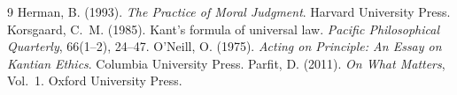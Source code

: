\documentclass{situationist-preprint}
\begin{document}
\begin{thebibliography}{9}\small
{} Herman, B. (1993). \emph{The Practice of Moral Judgment}. Harvard University Press.
 Korsgaard, C.~M. (1985). Kant's formula of universal law. \emph{Pacific Philosophical Quarterly}, 66(1--2), 24--47.
 O'Neill, O. (1975). \emph{Acting on Principle: An Essay on Kantian Ethics}. Columbia University Press.
 Parfit, D. (2011). \emph{On What Matters}, Vol.~1. Oxford University Press.
\end{thebibliography}
\end{document}
